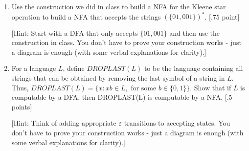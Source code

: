 \documentclass[11pt]{article}
\begin{document}
\begin{enumerate}
\item Use the construction we did in class to build a NFA for the Kleene star operation to build a NFA that accepts the strings $(\{01, 001\})^*$. [.75 point]

[Hint: Start with a DFA that only accepts $\{01, 001\}$ and then use the construction in class. You don't have to prove your construction works - just a diagram is enough (with some verbal explanations for clarity).]

\item For a language $L$, define $DROPLAST(L)$ to be the language containing all strings that can be obtained by removing the last symbol of a string in $L$. Thus, $DROPLAST(L) = \{x: xb \in L, \text{ for some }b \in \{0,1\}\}$. Show that if $L$ is computable by a DFA, then DROPLAST(L) is computable by a NFA. [.5 points]

[Hint: Think of adding appropriate $\varepsilon$ transitions to accepting states. You don't have to prove your construction works - just a diagram is enough (with some verbal explanations for clarity).]

\end{enumerate}
\end{document}
